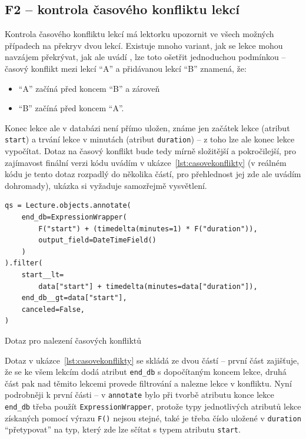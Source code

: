 \subsection{F2 -- kontrola časového konfliktu lekcí}

Kontrola časového konfliktu lekcí má lektorku upozornit ve všech možných případech na překryv dvou lekcí. Existuje mnoho variant, jak se lekce mohou navzájem překrývat, jak ale uvádí \cite{overlap}, lze toto ošetřit jednoduchou podmínkou -- časový konflikt mezi lekcí \enquote{A} a přidávanou lekcí \enquote{B} znamená, že:
\begin{itemize}
    \item \enquote{A} začíná před koncem \enquote{B} a zároveň
    \item \enquote{B} začíná před koncem \enquote{A}.
\end{itemize}

Konec lekce ale v databázi není přímo uložen, známe jen začátek lekce (atribut \verb|start|) a trvání lekce v minutách (atribut \verb|duration|) -- z toho lze ale konec lekce vypočítat. Dotaz na časový konflikt bude tedy mírně složitější a pokročilejší, pro zajímavost finální verzi kódu uvádím v ukázce~\ref{lst:casovekonflikty} (v reálném kódu je tento dotaz rozpadlý do několika částí, pro přehlednost jej zde ale uvádím dohromady), ukázka si vyžaduje samozřejmě vysvětlení.

\begin{listing}[ht]
	\begin{verbatim}
qs = Lecture.objects.annotate(
    end_db=ExpressionWrapper(
        F("start") + (timedelta(minutes=1) * F("duration")),
        output_field=DateTimeField()
    )
).filter(
    start__lt=
        data["start"] + timedelta(minutes=data["duration"]),
    end_db__gt=data["start"],
    canceled=False,
)
	\end{verbatim}
	\caption{Dotaz pro nalezení časových konfliktů}\label{lst:casovekonflikty}
\end{listing}

Dotaz v ukázce~\ref{lst:casovekonflikty} se skládá ze dvou částí -- první část zajišťuje, že se ke všem lekcím dodá atribut \verb|end_db| s dopočítaným koncem lekce, druhá část pak nad těmito lekcemi provede filtrování a nalezne lekce v konfliktu. Nyní podrobněji k první části -- v \verb|annotate| bylo při tvorbě atributu konce lekce \verb|end_db| třeba použít \verb|ExpressionWrapper|, protože typy jednotlivých atributů lekce získaných pomocí výrazu \verb|F()| nejsou stejné, také je třeba číslo uložené v \verb|duration| \enquote{přetypovat} na typ, který zde lze sčítat s typem atributu \verb|start|.

